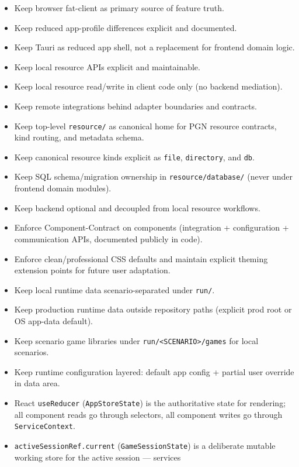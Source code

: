 \documentclass[]{article}
\providecommand{\tightlist}{%
  \setlength{\itemsep}{0pt}\setlength{\parskip}{0pt}}
\begin{document}
\begin{itemize}
\tightlist
\item
  Keep browser fat-client as primary source of feature truth.
\item
  Keep reduced app-profile differences explicit and documented.
\item
  Keep Tauri as reduced app shell, not a replacement for frontend domain
  logic.
\item
  Keep local resource APIs explicit and maintainable.
\item
  Keep local resource read/write in client code only (no backend
  mediation).
\item
  Keep remote integrations behind adapter boundaries and contracts.
\item
  Keep top-level \texttt{resource/} as canonical home for PGN resource
  contracts, kind routing, and metadata schema.
\item
  Keep canonical resource kinds explicit as \texttt{file},
  \texttt{directory}, and \texttt{db}.
\item
  Keep SQL schema/migration ownership in \texttt{resource/database/}
  (never under frontend domain modules).
\item
  Keep backend optional and decoupled from local resource workflows.
\item
  Enforce Component-Contract on components (integration + configuration
  + communication APIs, documented publicly in code).
\item
  Enforce clean/professional CSS defaults and maintain explicit theming
  extension points for future user adaptation.
\item
  Keep local runtime data scenario-separated under \texttt{run/}.
\item
  Keep production runtime data outside repository paths (explicit prod
  root or OS app-data default).
\item
  Keep scenario game libraries under
  \texttt{run/\textless{}SCENARIO\textgreater{}/games} for local
  scenarios.
\item
  Keep runtime configuration layered: default app config + partial user
  override in data area.
\item
  React \texttt{useReducer} (\texttt{AppStoreState}) is the
  authoritative state for rendering; all component reads go through
  selectors, all component writes go through \texttt{ServiceContext}.
\item
  \texttt{activeSessionRef.current} (\texttt{GameSessionState}) is a
  deliberate mutable working store for the active session --- services

\end{itemize}
\end{document}
